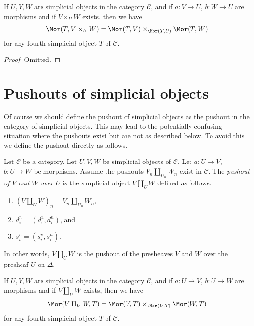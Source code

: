 \begin{lemma}
\label{lemma-fibre-product}
If $U, V, W$ are simplicial objects in the category $\mathcal{C}$,
and if $a : V \to U$, $b : W \to U$ are morphisms
and if $V \times_U W$ exists, then we have
$$
\Mor(T, V \times_U W) =
\Mor(T, V) \times_{\Mor(T, U)}
\Mor(T, W)
$$
for any fourth simplicial object $T$ of $\mathcal{C}$.
\end{lemma}

\begin{proof}
Omitted.
\end{proof}

\section{Pushouts of simplicial objects}
\label{section-push-outs}

\noindent
Of course we should define the pushout of simplicial objects
as the pushout in the category of simplicial objects. This
may lead to the potentially confusing situation where the
pushouts exist but are not as described below. To avoid
this we define the pushout directly as follows.

\begin{definition}
\label{definition-push-out}
Let $\mathcal{C}$ be a category.
Let $U, V, W$ be simplicial objects of $\mathcal{C}$.
Let $a : U \to V$, $b : U \to W$ be morphisms.
Assume the pushouts $V_n \amalg_{U_n} W_n$ exist in $\mathcal{C}$.
The {\it pushout of $V$ and $W$ over $U$} is the simplicial object
$V\amalg_U W$ defined as follows:
\begin{enumerate}
\item $(V \amalg_U W)_n = V_n \amalg_{U_n} W_n$,
\item $d^n_i = (d^n_i, d^n_i)$, and
\item $s^n_i = (s^n_i, s^n_i)$.
\end{enumerate}
In other words, $V\amalg_U W$ is the pushout of the presheaves
$V$ and $W$ over the presheaf $U$ on $\Delta$.
\end{definition}

\begin{lemma}
\label{lemma-push-out}
If $U, V, W$ are simplicial objects in the category $\mathcal{C}$,
and if $a : U \to V$, $b : U \to W$ are morphisms
and if $V\amalg_U W$ exists, then we have
$$
\Mor(V\amalg_U W, T) =
\Mor(V, T) \times_{\Mor(U, T)}
\Mor(W, T)
$$
for any fourth simplicial object $T$ of $\mathcal{C}$.
\end{lemma}

